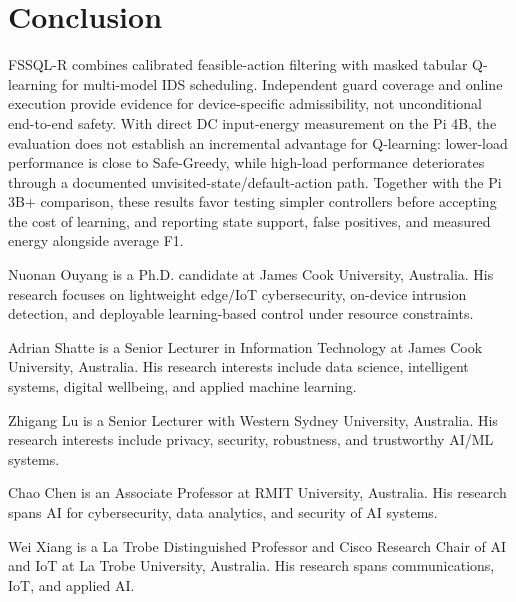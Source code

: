 \documentclass[journal]{IEEEtran}
\begin{document}
\section{Conclusion}
FSSQL-R combines calibrated feasible-action filtering with masked tabular Q-learning for multi-model IDS scheduling. Independent guard coverage and online execution provide evidence for device-specific admissibility, not unconditional end-to-end safety. With direct DC input-energy measurement on the Pi 4B, the evaluation does not establish an incremental advantage for Q-learning: lower-load performance is close to Safe-Greedy, while high-load performance deteriorates through a documented unvisited-state/default-action path. Together with the Pi 3B+ comparison, these results favor testing simpler controllers before accepting the cost of learning, and reporting state support, false positives, and measured energy alongside average F1.




\newpage

\begin{IEEEbiographynophoto}{Nuonan Ouyang}
is a Ph.D. candidate at James Cook University, Australia. His research focuses on lightweight edge/IoT cybersecurity, on-device intrusion detection, and deployable learning-based control under resource constraints.
\end{IEEEbiographynophoto}
\begin{IEEEbiographynophoto}{Adrian Shatte}
is a Senior Lecturer in Information Technology at James Cook University, Australia. His research interests include data science, intelligent systems, digital wellbeing, and applied machine learning.
\end{IEEEbiographynophoto}
\begin{IEEEbiographynophoto}{Zhigang Lu}
is a Senior Lecturer with Western Sydney University, Australia. His research interests include privacy, security, robustness, and trustworthy AI/ML systems.
\end{IEEEbiographynophoto}
\begin{IEEEbiographynophoto}{Chao Chen}
is an Associate Professor at RMIT University, Australia. His research spans AI for cybersecurity, data analytics, and security of AI systems.
\end{IEEEbiographynophoto}
\begin{IEEEbiographynophoto}{Wei Xiang}
is a La Trobe Distinguished Professor and Cisco Research Chair of AI and IoT at La Trobe University, Australia. His research spans communications, IoT, and applied AI.
\end{IEEEbiographynophoto}
\vfill
\end{document}
